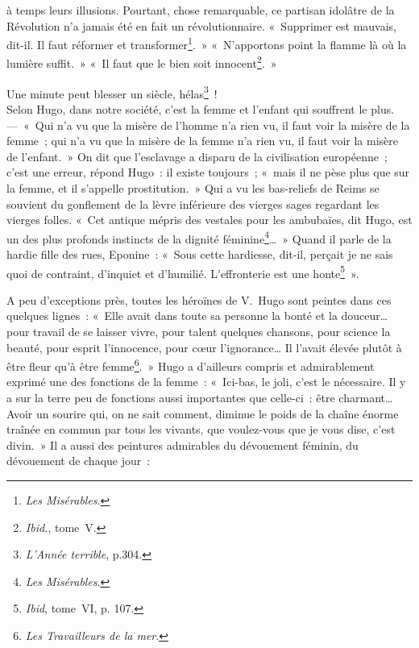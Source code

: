 \documentclass[french,twoside]{book} %
\begin{document}
à temps leurs illusions. Pourtant, chose remarquable, ce partisan idolâtre de la Révolution n’a jamais été en fait un révolutionnaire. « Supprimer est mauvais, dit-il. Il faut réformer et transformer\footnote{\emph{Les Misérables}.}. » « N’apportons point la flamme là où la lumière suffit. » « Il faut que le bien soit innocent\footnote{\emph{Ibid.}, tome V.}. »\par

Une minute peut blesser un siècle, hélas\footnote{\emph{L’Année terrible}, p.304.} !\\

\noindent Selon Hugo, dans notre société, c’est la femme et l’enfant qui souffrent le plus. — « Qui n’a vu que la misère de l’homme n’a rien vu, il faut voir la misère de la femme ; qui n’a vu que la misère de la femme n’a rien vu, il faut voir la misère de l’enfant. » On dit que l’esclavage a disparu de la civilisation européenne ; c’est une erreur, répond Hugo : il existe toujours ; « mais il ne pèse plus que sur la femme, et il s’appelle prostitution. » Qui a vu les bas-reliefs de Reims se souvient du gonflement de la lèvre inférieure des vierges sages regardant les vierges folles. « Cet antique mépris des vestales pour les ambubaïes, dit Hugo, est un des plus profonds instincts de la dignité féminine\footnote{\emph{Les Misérables}.}… » Quand il parle de la hardie fille des rues, Eponine : « Sous cette hardiesse, dit-il, perçait je ne sais quoi de contraint, d’inquiet et d’humilié. L’effronterie est une honte\footnote{\emph{Ibid}, tome VI, p. 107.} ».\par
A peu d’exceptions près, toutes les héroïnes de V. Hugo sont peintes dans ces quelques lignes : « Elle avait dans toute sa personne la bonté et la douceur… pour travail de se laisser vivre, pour talent quelques chansons, pour science la beauté, pour esprit l’innocence, pour cœur l’ignorance… Il l’avait élevée plutôt à être fleur qu’à être femme\footnote{\emph{Les Travailleurs de la mer}.}. » Hugo a d’ailleurs compris et admirablement exprimé une des fonctions de la femme : « Ici-bas, le joli, c’est le nécessaire. Il y a sur la terre peu de fonctions aussi importantes que celle-ci : être charmant… Avoir un sourire qui, on ne sait comment, diminue le poids de la chaîne énorme traînée en commun par tous les vivants, que voulez-vous que je vous dise, c’est divin. » Il a aussi des peintures admirables du dévouement féminin, du dévouement de chaque jour :\par
\end{document}
